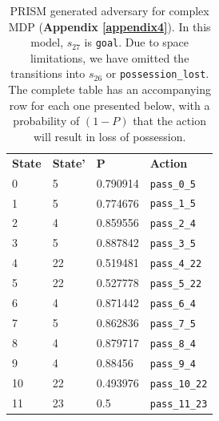 \documentclass{l4proj}
\begin{document}
\begin{table}[h]
\centering
\caption{PRISM generated adversary for complex MDP (\textbf{Appendix \ref{appendix4}}). In this model, $s_{27}$ is \texttt{goal}. Due to space limitations, we have omitted the transitions into $s_{26}$ or  \texttt{possession\_lost}. The complete table has an accompanying row for each one presented below, with a probability of $(1-P)$ that the action will result in loss of possession.}
\label{tab:adv-mdp2}
\begin{tabular}{llll}
\textbf{State} & \textbf{State'} & \textbf{P}         & \textbf{Action}     \\
0  & 5  & 0.790914 & \texttt{pass\_0\_5}   \\
1  & 5  & 0.774676 & \texttt{pass\_1\_5}   \\
2  & 4  & 0.859556 & \texttt{pass\_2\_4}   \\
3  & 5  & 0.887842 & \texttt{pass\_3\_5}   \\
4  & 22 & 0.519481 & \texttt{pass\_4\_22}  \\
5  & 22 & 0.527778 & \texttt{pass\_5\_22}  \\
6  & 4  & 0.871442 & \texttt{pass\_6\_4}   \\
7  & 5  & 0.862836 & \texttt{pass\_7\_5}   \\
8  & 4  & 0.879717 & \texttt{pass\_8\_4}   \\
9  & 4  & 0.88456  & \texttt{pass\_9\_4}   \\
10 & 22 & 0.493976 & \texttt{pass\_10\_22} \\
11 & 23 & 0.5      & \texttt{pass\_11\_23} \\

\end{tabular}
\end{table}
\end{document}
